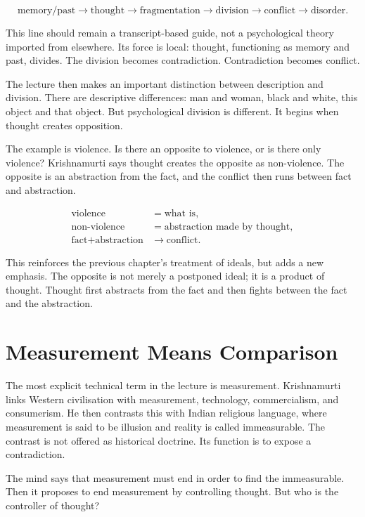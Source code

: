 \documentclass[11pt,oneside]{book}
\begin{document}
\begin{equation}
\text{memory/past}
\longrightarrow
\text{thought}
\longrightarrow
\text{fragmentation}
\longrightarrow
\text{division}
\longrightarrow
\text{conflict}
\longrightarrow
\text{disorder}.
\end{equation}

This line should remain a transcript-based guide, not a psychological theory imported from elsewhere. Its force is local: thought, functioning as memory and past, divides. The division becomes contradiction. Contradiction becomes conflict.

The lecture then makes an important distinction between description and division. There are descriptive differences: man and woman, black and white, this object and that object. But psychological division is different. It begins when thought creates opposition.

The example is violence. Is there an opposite to violence, or is there only violence? Krishnamurti says thought creates the opposite as non-violence. The opposite is an abstraction from the fact, and the conflict then runs between fact and abstraction.

\begin{align}
\text{violence} &= \text{what is},\\
\text{non-violence} &= \text{abstraction made by thought},\\
\text{fact}+\text{abstraction} &\longrightarrow \text{conflict}.
\end{align}

This reinforces the previous chapter's treatment of ideals, but adds a new emphasis. The opposite is not merely a postponed ideal; it is a product of thought. Thought first abstracts from the fact and then fights between the fact and the abstraction.

\section{Measurement Means Comparison}

The most explicit technical term in the lecture is measurement. Krishnamurti links Western civilisation with measurement, technology, commercialism, and consumerism. He then contrasts this with Indian religious language, where measurement is said to be illusion and reality is called immeasurable. The contrast is not offered as historical doctrine. Its function is to expose a contradiction.

The mind says that measurement must end in order to find the immeasurable. Then it proposes to end measurement by controlling thought. But who is the controller of thought?
\end{document}
